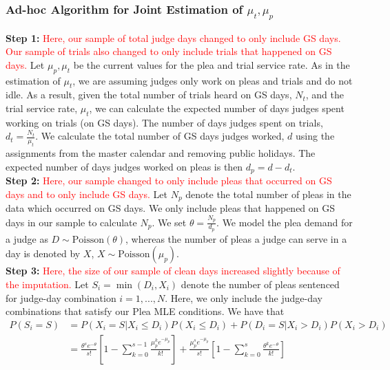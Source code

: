 \documentclass[11pt]{article}
\begin{document}
    \subsubsection{Ad-hoc Algorithm for Joint Estimation of $\mu_t,\mu_p$}
      \textbf{Step 1:} \textcolor{red}{Here, our sample of total judge days changed to only include GS days. Our sample of trials also changed to only include trials that happened on GS days.} Let $\mu_p,\mu_t$ be the current values for the plea and trial service rate. As in the estimation of $\mu_t$, we are assuming judges only work on pleas and trials and do not idle. As a result, given the total number of trials heard on GS days, $N_{t}$, and the trial service rate, $\mu_t$, we can calculate the expected number of days judges spent working on trials (on GS days). The number of days judges spent on trials, $d_{t} = \frac{N_{t}}{\mu_t}$. We calculate the total number of GS days judges worked, $d$ using the assignments from the master calendar and removing public holidays. The expected number of days judges worked on pleas is then $d_{p} = d - d_{t}$. \\

      \noindent \textbf{Step 2:} \textcolor{red}{Here, our sample changed to only include pleas that occurred on GS days and to only include GS days.} Let $N_p$ denote the total number of pleas in the data which occurred on GS days. We only include pleas that happened on GS days in our sample to calculate $N_p$. We set $\theta = \frac{N_p}{d_p}$. We model the plea demand for a judge as $D \sim \text{Poisson}(\theta)$, whereas the number of pleas a judge can serve in a day is denoted by $X$, $X \sim \text{Poisson}(\mu_p)$. \\

      \noindent \textbf{Step 3:} \textcolor{red}{Here, the size of our sample of clean days increased slightly because of the imputation.} Let $S_i = \min(D_i,X_i)$ denote the number of pleas sentenced for judge-day combination $i=1,...,N$. Here, we only include the judge-day combinations that satisfy our Plea MLE conditions. We have that
			\begin{align*}
				P(S_i = S) &= P(X_i = S | X_i \leq D_i) P(X_i \leq D_i) + P(D_i = S | X_i > D_i) P(X_i > D_i) \\
          &= \frac{\theta^s e^{-\theta}}{s!}[1-\sum_{k=0}^{s-1}\frac{\mu_p^k e^{-\mu_p}}{k!}] + \frac{\mu_p^s e^{-\mu_p}}{s!}[1-\sum_{k=0}^s \frac{\theta^k e^{-\theta}}{k!}]
			\end{align*}
\end{document}
